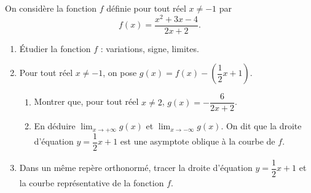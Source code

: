\documentclass[11pt,fleqn, openany]{book} %
\begin{document}
\begin{exercise}[topic=lim24]
On considère la fonction $f$ définie pour tout réel $x\neq -1$ par 
\[f(x)=\dfrac{x^2+3x-4}{2x+2}.\]
\begin{enumerate}
\item Étudier la fonction $f$ : variations, signe, limites.
\item Pour tout réel $x\neq -1$, on pose $g(x)=f(x)-\left(\dfrac{1}{2}x+1\right)$.
\begin{enumerate}
\item Montrer que, pour tout réel $x\neq 2$, $g(x)=-\dfrac{6}{2x+2}$.
\item En déduire $\displaystyle \lim_{x \to +\infty} g(x)$ et $\displaystyle \lim_{x \to -\infty} g(x)$. On dit que la droite d'équation $y=\dfrac{1}{2}x+1$ est une asymptote oblique à la courbe de $f$.
\end{enumerate}
\item Dans un même repère orthonormé, tracer la droite d'équation $y=\dfrac{1}{2}x+1$ et la courbe représentative de la fonction $f$.
\end{enumerate}
\end{exercise}
\end{document}

